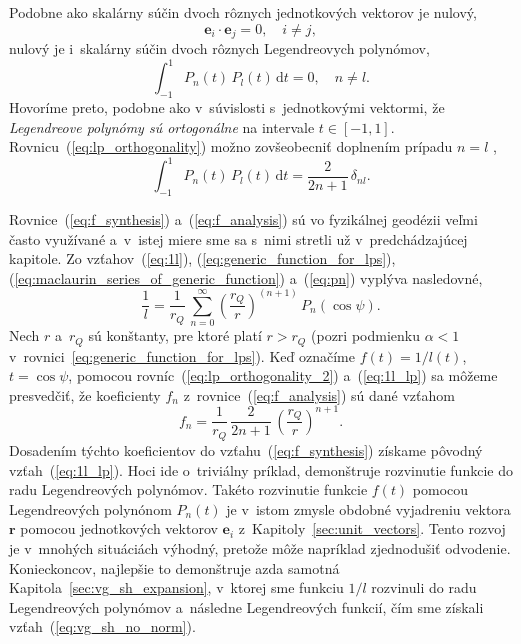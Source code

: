 \documentclass[a4paper, 12pt]{book}
\newcommand{\diff}{\mathrm d}
\let\vec\mathbf
\begin{document}
Podobne ako skalárny súčin dvoch rôznych jednotkových vektorov je nulový,
%
\begin{equation}
\label{eq:ei_orthogonality}
\vec e_i \cdot \vec e_j = 0{,} \quad i \neq j{,}
\end{equation}
%
nulový je i~skalárny súčin dvoch rôznych Legendreovych polynómov,
%
\begin{equation}
\label{eq:lp_orthogonality}
\int_{-1}^1 P_n(t) \, P_l(t) \, \diff t = 0{,} \quad n \neq l{.}
\end{equation}
%
Hovoríme preto, podobne ako v~súvislosti s~jednotkovými vektormi, že 
\emph{Legendreove polynómy sú ortogonálne} na intervale $t \in [-1, 1].$  
Rovnicu~(\ref{eq:lp_orthogonality}) možno zovšeobecniť doplnením prípadu $n 
= l$ \citep[napríklad][]{Hobson},
%
\begin{equation}
\label{eq:lp_orthogonality_2}
\int_{-1}^1 P_n(t) \, P_l(t) \, \diff t = \frac{2}{2n + 1} \, \delta_{nl}{.}
\end{equation}

Rovnice~(\ref{eq:f_synthesis}) a~(\ref{eq:f_analysis}) sú vo fyzikálnej 
geodézii veľmi často využívané a~v~istej miere sme sa s~nimi stretli už 
v~predchádzajúcej kapitole.  Zo vzťahov~(\ref{eq:1l}), 
(\ref{eq:generic_function_for_lps}), 
(\ref{eq:maclaurin_series_of_generic_function}) a~(\ref{eq:pn}) vyplýva 
nasledovné,
%
\begin{equation}
\label{eq:1l_lp}
\frac{1}{l} = \frac{1}{r_Q} \, \sum_{n = 0}^\infty \left( \frac{r_Q}{r} 
\right)^{(n + 1)} \, P_n(\cos\psi){.}
\end{equation}
%
Nech $r$ a~$r_Q$ sú konštanty, pre ktoré platí $r > r_Q$ (pozri podmienku 
$\alpha < 1$ v~rovnici~\ref{eq:generic_function_for_lps}).  Keď označíme $f(t) 
= 1 \slash l(t)$, $t = \cos\psi$, pomocou rovníc~(\ref{eq:lp_orthogonality_2}) 
a~(\ref{eq:1l_lp}) sa môžeme presvedčiť, že koeficienty $f_n$ 
z~rovnice~(\ref{eq:f_analysis}) sú dané vzťahom
%
\begin{equation}
f_n = \frac{1}{r_Q} \, \frac{2}{2n + 1} \, \left( \frac{r_Q}{r} \right)^{n 
+ 1}{.}
\end{equation}
%
Dosadením týchto koeficientov do vzťahu~(\ref{eq:f_synthesis}) získame pôvodný 
vzťah~(\ref{eq:1l_lp}).  Hoci ide o~triviálny príklad, demonštruje rozvinutie 
funkcie do radu Legendreových polynómov.  Takéto rozvinutie funkcie $f(t)$ 
pomocou Legendreových polynónom $P_n(t)$ je v~istom zmysle obdobné vyjadreniu 
vektora $\vec r$ pomocou jednotkových vektorov $\vec e_i$ 
z~Kapitoly~\ref{sec:unit_vectors}.  Tento rozvoj je v~mnohých situáciách 
výhodný, pretože môže napríklad zjednodušiť odvodenie.  Konieckoncov, najlepšie 
to demonštruje azda samotná Kapitola~\ref{sec:vg_sh_expansion}, v~ktorej sme 
funkciu $1 \slash l$ rozvinuli do radu Legendreových polynómov a~následne 
Legendreových funkcií, čím sme získali vzťah~(\ref{eq:vg_sh_no_norm}).
\end{document}
